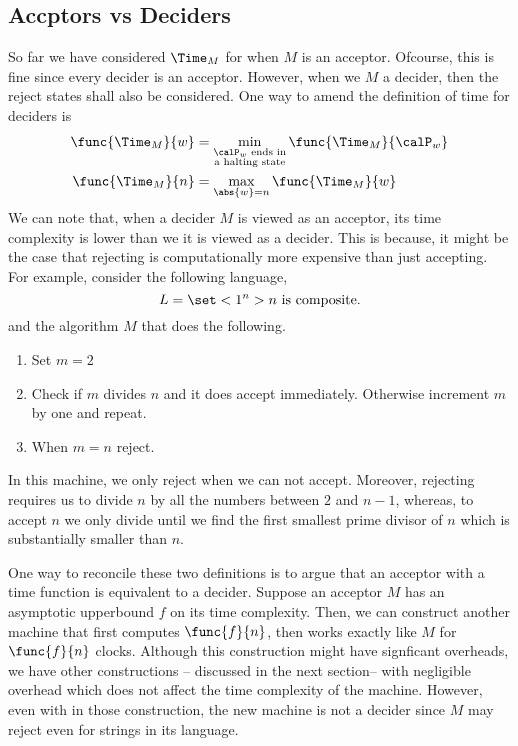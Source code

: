 \subsection{Accptors vs Deciders}
So far we have considered \(\Time_M\) for when \(M\) is an acceptor. Ofcourse, this is fine since every decider is an acceptor. However, when we \(M\) a decider, then the reject states shall also be considered. One way to amend the definition of time for deciders is 
\begin{align*}
    \func{\Time_M}{w} &= \min_{\substack{\calP_w \text{ ends in}\\\text{a halting state}}}\func{\Time_M}{\calP_w} \\
    \func{\Time_M}{n} &= \max_{\abs{w} = n } \func{\Time_M}{w}
\end{align*}
We can note that, when a decider \(M\) is viewed as an acceptor, its time complexity is lower than we it is viewed as a decider. This is because, it might be the case that rejecting is computationally more expensive than just accepting. For example, consider the following language,
\begin{equation*}
    L = \set<1^n>{n \text{ is composite}.}
\end{equation*}
and the algorithm \(M\) that does the following.
\begin{enumerate}
    \item Set \(m = 2\)
    \item  Check if \(m\) divides \(n\) and it does accept immediately. Otherwise increment \(m\) by one and repeat.
    \item When \(m = n\) reject.
\end{enumerate}
In this machine, we only reject when we can not accept. Moreover, rejecting requires us to divide \(n\) by all the numbers between \(2\) and \(n-1\), whereas, to accept \(n\) we only divide until we find the first smallest prime divisor of \(n\) which is substantially smaller than \(n\).

One way to reconcile these two definitions is to argue that an acceptor with a time function is equivalent to a decider. Suppose an acceptor \(M\) has an asymptotic upperbound \(f\) on its time complexity. Then, we can construct another machine that first computes \(\func{f}{n}\), then works exactly like \(M\) for \(\func{f}{n}\) clocks. Although this construction might have signficant overheads, we have other constructions -- discussed in the next section-- with negligible overhead which does not affect the time complexity of the machine. However, even with in those construction, the new machine is not a decider since \(M\) may reject even for strings in its language. 

